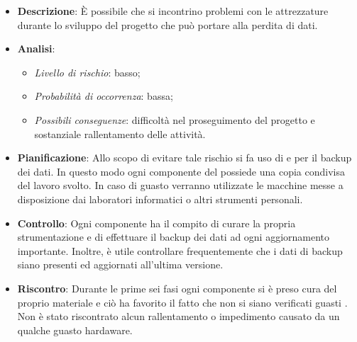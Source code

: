 			\begin{itemize}
				\item \textbf{Descrizione}: È possibile che si incontrino problemi con le attrezzature  durante lo sviluppo del progetto che può portare alla perdita di dati.
				\item \textbf{Analisi}:
				\begin{itemize}
					\item \textit{Livello di rischio}: basso;
					\item \textit{Probabilità di occorrenza}: bassa;
					\item \textit{Possibili conseguenze}: difficoltà nel proseguimento del progetto e sostanziale rallentamento delle attività.
				\end{itemize}
				\item \textbf{Pianificazione}: Allo scopo di evitare tale rischio si fa uso di \textit{} e \textit{} per il backup dei dati. In questo modo ogni componente del  possiede una copia condivisa del lavoro svolto. In caso di guasto  verranno utilizzate le macchine messe a disposizione dai laboratori informatici o altri strumenti personali.
				\item \textbf{Controllo}: Ogni componente ha il compito di curare la propria strumentazione  e di effettuare il backup dei dati ad ogni aggiornamento importante. Inoltre, è utile controllare frequentemente che i dati di backup siano presenti ed aggiornati all'ultima versione.
				\item \textbf{Riscontro}: Durante le prime sei fasi ogni componente si è preso cura del proprio materiale e ciò ha favorito il fatto che non si siano verificati guasti . Non è stato riscontrato alcun rallentamento o impedimento causato da un qualche guasto hardaware.
			\end{itemize}
